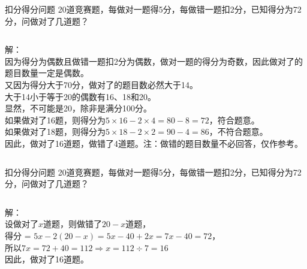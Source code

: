 \documentclass[aspectratio=169]{ctexbeamer} %
\date{\today}
\begin{document}
\begin{frame}[t]{扣分得分问题}
20道竞赛题，每做对一题得5分，每做错一题扣2分，已知得分为72分，问做对了几道题？\\
\pause
\begin{columns}
解：\\
因为得分为偶数且做错一题扣2分为偶数，做对一题的得分为奇数，因此做对了的题目数量一定是偶数。\\
又因为得分大于70分，做对了的题目数必然大于14。\\
大于14小于等于20的偶数有16、18和20。\\
显然，不可能是20，除非是满分100分。\\
如果做对了16题，则得分为$5 \times 16 - 2 \times 4 = 80 - 8 = 72$，符合题意。\\
如果做对了18题，则得分为$5 \times 18 - 2 \times 2 = 90 - 4 = 86$，不符合题意。\\
因此，做对了\alert{16}道题，做错了\alert{4}道题。注：做错的题目数量不必回答，仅作参考。

\end{columns}
\end{frame}

\begin{frame}[t]{扣分得分问题}
20道竞赛题，每做对一题得5分，每做错一题扣2分，已知得分为72分，问做对了几道题？\\
\pause
\begin{columns}
解：\\
设做对了$x$道题，则做错了$20 - x$道题，\\
得分 = $5x - 2(20 - x) = 5x - 40 + 2x = 7x - 40 = 72$，\\
所以$7x = 72 + 40 = 112 \Rightarrow x = 112 \div 7 = 16$ \\
因此，做对了\alert{16}道题。

\end{columns}
\end{frame}
\end{document}
